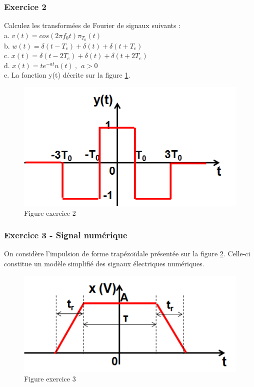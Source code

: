 \documentclass[11pt]{report}
\begin{document}
	\subsubsection{Exercice 2}
	
	Calculez les transformées de Fourier de signaux suivants :\\
	
	a. $v(t) = cos(2\pi f_0 t)\pi_{T_0}(t)$\\
	
	b. $w(t) = \delta(t-T_e)+\delta(t)+\delta(t+T_e)$\\
	
	c. $x(t) = \delta(t-2T_e)+\delta(t)+\delta(t+2T_e)$\\
	
	d. $x(t) = te^{-at}u(t)~,~~a>0$\\
	
	e. La fonction y(t) décrite sur la figure \ref{Fig:Exo_TF_2}.
	
	\begin{figure}[h!]
		\centering
		\includegraphics[scale=0.5]{images/exo_2_TF.png}
		\caption{Figure exercice 2}	
		\label{Fig:Exo_TF_2} 
	\end{figure}
	
	
	\subsubsection{Exercice 3 - Signal numérique}
	On considère l'impulsion de forme trapézoïdale présentée sur la figure \ref{Fig:Exo_TF_3}. Celle-ci constitue un modèle simplifié des signaux électriques numériques.\\
	
	\begin{figure}[h!]
		\centering
		\includegraphics[scale=0.6]{images/exo_3_TF.png}
		\caption{Figure exercice 3}	
		\label{Fig:Exo_TF_3} 
	\end{figure}
	
\end{document}
